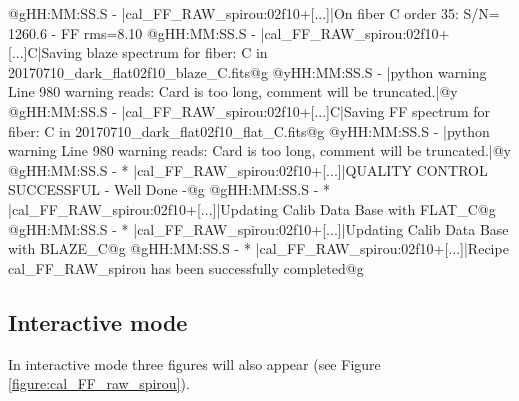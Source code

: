 \begin{cmdboxprintspecial}[fontupper=\tiny, fontlower=\tiny]
@gHH:MM:SS.S -   |cal_FF_RAW_spirou:02f10+[...]|On fiber C order 35: S/N= 1260.6  - FF rms=8.10 %
@gHH:MM:SS.S -   |cal_FF_RAW_spirou:02f10+[...]C|Saving blaze spectrum for fiber: C in 20170710_dark_flat02f10_blaze_C.fits@g
@yHH:MM:SS.S - \@ |python warning Line 980  warning reads: Card is too long, comment will be truncated.|@y
@gHH:MM:SS.S -   |cal_FF_RAW_spirou:02f10+[...]C|Saving FF spectrum for fiber: C in 20170710_dark_flat02f10_flat_C.fits@g
@yHH:MM:SS.S - \@ |python warning Line 980  warning reads: Card is too long, comment will be truncated.|@y
@gHH:MM:SS.S - * |cal_FF_RAW_spirou:02f10+[...]|QUALITY CONTROL SUCCESSFUL - Well Done -@g
@gHH:MM:SS.S - * |cal_FF_RAW_spirou:02f10+[...]|Updating Calib Data Base with FLAT_C@g
@gHH:MM:SS.S - * |cal_FF_RAW_spirou:02f10+[...]|Updating Calib Data Base with BLAZE_C@g
@gHH:MM:SS.S - * |cal_FF_RAW_spirou:02f10+[...]|Recipe cal_FF_RAW_spirou has been successfully completed@g

\end{cmdboxprintspecial}


\newpage
\subsection{Interactive mode}

\noindent In interactive mode three figures will also appear (see Figure \ref{figure:cal_FF_raw_spirou}).

